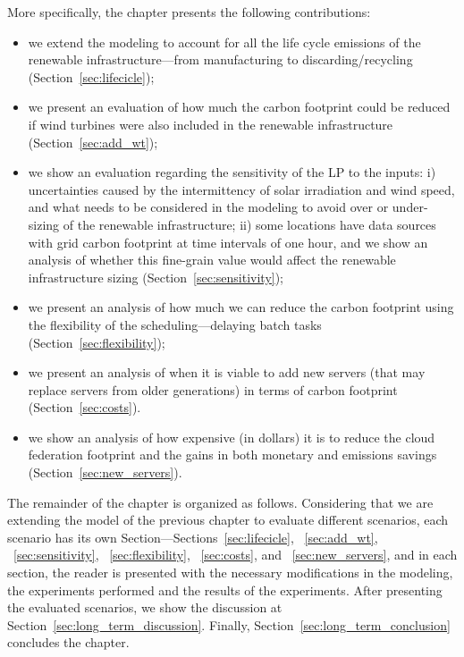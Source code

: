 More specifically, the chapter presents the following contributions:

\begin{itemize}
 
\item we extend the modeling to account for all the life cycle emissions of the renewable infrastructure---from manufacturing to discarding/recycling (Section~\ref{sec:lifecicle});
\item we present an evaluation of how much the carbon footprint could be reduced if wind turbines were also included in the renewable infrastructure   (Section~\ref{sec:add_wt});
\item we show an evaluation regarding the sensitivity of the LP to the inputs: i) uncertainties caused by the intermittency of solar irradiation and wind speed, and what needs to be considered in the modeling to avoid over or under-sizing of the renewable infrastructure; ii) some locations have data sources with grid carbon footprint at time intervals of one hour, and we show an analysis of whether this fine-grain value would affect the renewable infrastructure sizing  (Section~\ref{sec:sensitivity});
\item we present an analysis of how much we can reduce the carbon footprint using the flexibility of the scheduling---delaying batch tasks (Section~\ref{sec:flexibility});
\item we present an analysis of when it is viable to add new servers (that may replace servers from older generations) in terms of carbon footprint  (Section~\ref{sec:costs}).
\item we show an analysis of how expensive (in dollars) it is to reduce the cloud federation footprint and the gains in both monetary and emissions savings (Section~\ref{sec:new_servers}).
  
\end{itemize}


The remainder of the chapter is organized as follows. Considering that we are extending the model of the previous chapter to evaluate different scenarios, each scenario has its own Section---Sections~\ref{sec:lifecicle}, ~\ref{sec:add_wt}, ~\ref{sec:sensitivity}, ~\ref{sec:flexibility}, ~\ref{sec:costs}, and  ~\ref{sec:new_servers}, and in each section, the reader is presented with the necessary modifications in the modeling, the experiments performed and the results of the experiments. After presenting the evaluated scenarios, we show the discussion at Section~\ref{sec:long_term_discussion}. Finally, Section~\ref{sec:long_term_conclusion} concludes the chapter.




